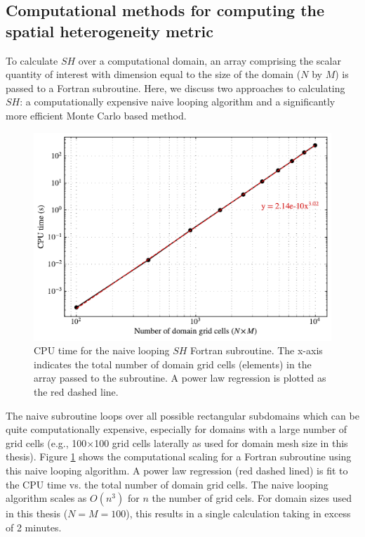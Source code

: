 \subsection{Computational methods for computing the spatial heterogeneity metric}\label{sh-metric-calculation}
To calculate $SH$ over a computational domain, an array comprising the scalar quantity of interest with dimension equal to the size of the domain ($N$ by $M$) is passed to a Fortran subroutine. Here, we discuss two approaches to calculating $SH$: a computationally expensive naive looping algorithm and a significantly more efficient Monte Carlo based method.

\begin{figure}[!t]
	\centering
	\includegraphics[width=\textwidth]{figures/chapter2/NSH-performance.pdf}
	\caption{CPU time for the naive looping $SH$ Fortran subroutine. The x-axis indicates the total number of domain grid cells (elements) in the array passed to the subroutine. A power law regression is plotted as the red dashed line.}
	\label{fig:nsh-performance}
\end{figure}

The naive subroutine loops over all possible rectangular subdomains which can be quite computationally expensive, especially for domains with a large number of grid cells (e.g., 100$\times$100 grid cells laterally as used for domain mesh size in this thesis). Figure \ref{fig:nsh-performance} shows the computational scaling for a Fortran subroutine using this naive looping algorithm. A power law regression (red dashed lined) is fit to the CPU time vs. the total number of domain grid cells. The naive looping algorithm scales as $O(n^3)$ for $n$ the number of grid cels. For domain sizes used in this thesis ($N=M=100$), this results in a single calculation taking in excess of 2 minutes.


